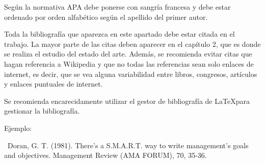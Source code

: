 

Según la normativa APA debe ponerse con sangría francesa y debe estar ordenado por orden alfabético según el apellido del primer autor.

Toda la bibliografía que aparezca en este apartado debe estar citada en el trabajo. La mayor parte de las citas deben aparecer en el capítulo 2, que es donde se realiza el estudio del estado del arte. Además, se recomienda evitar citas que hagan referencia a Wikipedia y que no todas las referencias sean solo enlaces de internet, es decir, que se vea alguna variabilidad entre libros, congresos, artículos y enlaces puntuales de internet.

Se recomienda encarecidamente utilizar el gestor de bibliografía de \LaTeX para gestionar la bibliografía.

Ejemplo:

\ Doran, G. T. (1981). There's a S.M.A.R.T. way to write management's goals and objectives. Management Review (AMA FORUM), 70, 35-36.